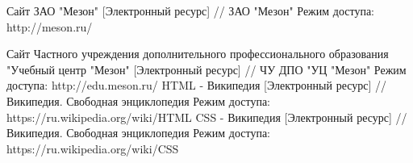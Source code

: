 \begingroup
\renewcommand{\section}[2]{\anonsection{Список использованных источников}}
\begin{thebibliography}{00}
        Сайт ЗАО "Мезон"
        [Электронный ресурс] //
        ЗАО "Мезон"
        Режим доступа: http://meson.ru/

        Сайт Частного учреждения дополнительного профессионального образования "Учебный центр "Мезон"
        [Электронный ресурс] //
        ЧУ ДПО "УЦ "Мезон"
        Режим доступа: http://edu.meson.ru/
        HTML - Википедия 
        [Электронный ресурс] //
        Википедия. Свободная энциклопедия
        Режим доступа: https://ru.wikipedia.org/wiki/HTML
        CSS - Википедия 
        [Электронный ресурс] //
        Википедия. Свободная энциклопедия
        Режим доступа: https://ru.wikipedia.org/wiki/CSS



\end{thebibliography}
\endgroup

\clearpage

